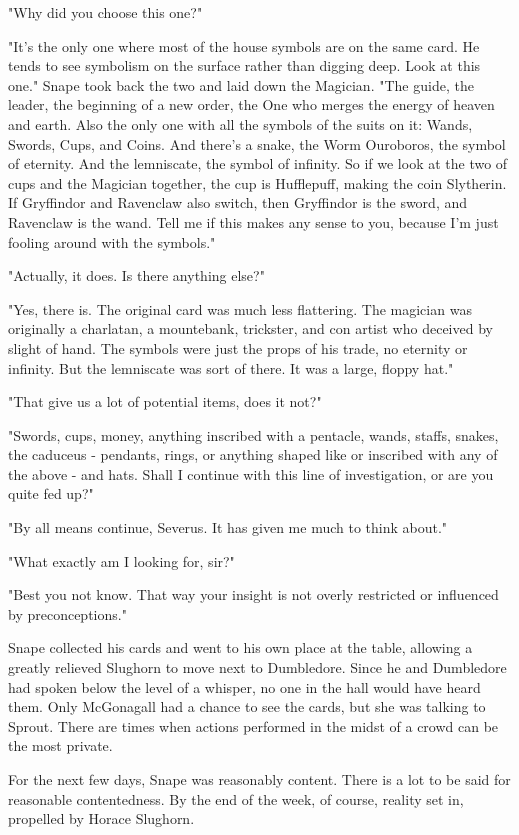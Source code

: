 "Why did you choose this one?"

"It's the only one where most of the house symbols are on the same card. He tends to see symbolism on the surface rather than digging deep. Look at this one." Snape took back the two and laid down the Magician. "The guide, the leader, the beginning of a new order, the One who merges the energy of heaven and earth. Also the only one with all the symbols of the suits on it: Wands, Swords, Cups, and Coins. And there's a snake, the Worm Ouroboros, the symbol of eternity. And the lemniscate, the symbol of infinity. So if we look at the two of cups and the Magician together, the cup is Hufflepuff, making the coin Slytherin. If Gryffindor and Ravenclaw also switch, then Gryffindor is the sword, and Ravenclaw is the wand. Tell me if this makes any sense to you, because I'm just fooling around with the symbols."

"Actually, it does. Is there anything else?"

"Yes, there is. The original card was much less flattering. The magician was originally a charlatan, a mountebank, trickster, and con artist who deceived by slight of hand. The symbols were just the props of his trade, no eternity or infinity. But the lemniscate was sort of there. It was a large, floppy hat."

"That give us a lot of potential items, does it not?"

"Swords, cups, money, anything inscribed with a pentacle, wands, staffs, snakes, the caduceus - pendants, rings, or anything shaped like or inscribed with any of the above - and hats. Shall I continue with this line of investigation, or are you quite fed up?"

"By all means continue, Severus. It has given me much to think about."

"What exactly am I looking for, sir?"

"Best you not know. That way your insight is not overly restricted or influenced by preconceptions."

Snape collected his cards and went to his own place at the table, allowing a greatly relieved Slughorn to move next to Dumbledore. Since he and Dumbledore had spoken below the level of a whisper, no one in the hall would have heard them. Only McGonagall had a chance to see the cards, but she was talking to Sprout. There are times when actions performed in the midst of a crowd can be the most private.

For the next few days, Snape was reasonably content. There is a lot to be said for reasonable contentedness. By the end of the week, of course, reality set in, propelled by Horace Slughorn.

